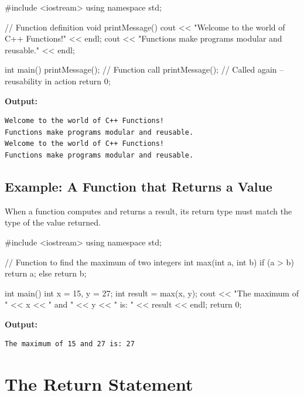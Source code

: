 \begin{cppcode}
#include <iostream>
using namespace std;

// Function definition
void printMessage()
{
    cout << "Welcome to the world of C++ Functions!"
         << endl;
    cout << "Functions make programs modular and reusable."
         << endl;
}

int main()
{
    printMessage();   // Function call
    printMessage();   // Called again -- reusability in action
    return 0;
}
\end{cppcode}

\noindent\textbf{Output:}
\begin{verbatim}
Welcome to the world of C++ Functions!
Functions make programs modular and reusable.
Welcome to the world of C++ Functions!
Functions make programs modular and reusable.
\end{verbatim}

\subsection{Example: A Function that Returns a Value}

When a function computes and returns a result, its return type must match the
type of the value returned.

\begin{cppcode}
#include <iostream>
using namespace std;

// Function to find the maximum of two integers
int max(int a, int b)
{
    if (a > b)
        return a;
    else
        return b;
}

int main()
{
    int x = 15, y = 27;
    int result = max(x, y);
    cout << "The maximum of " << x << " and " << y
         << " is: " << result << endl;
    return 0;
}
\end{cppcode}

\noindent\textbf{Output:}
\begin{verbatim}
The maximum of 15 and 27 is: 27
\end{verbatim}

\section{The Return Statement}
\label{sec:return-statement}

